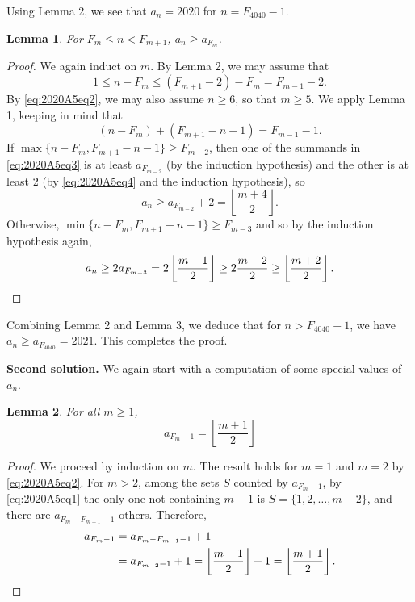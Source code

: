 \documentclass[amssymb,twocolumn,pra,10pt,aps]{revtex4-1}
\newtheorem{lemma}{Lemma}
\begin{document}
\begin{itemize}
Using Lemma 2, we see that $a_n = 2020$ for $n = F_{4040}-1$.

\begin{lemma}
For $F_m \leq n < F_{m+1}$, $a_n \geq a_{F_m}$.
\end{lemma}
\begin{proof}
We again induct on $m$.
By Lemma 2, we may assume that 
\begin{equation} \label{eq:2020A5eq4}
1 \leq n -F_m \leq (F_{m+1}-2) - F_m = F_{m-1} - 2.
\end{equation}
By \eqref{eq:2020A5eq2}, we may also assume $n \geq 6$, so that $m \geq 5$. We apply Lemma 1, keeping in mind that
\[
(n-F_m) + (F_{m+1}-n-1) = F_{m-1}-1.
\]
If $\max\{n-F_m, F_{m+1}-n-1\} \geq F_{m-2}$, then one of the summands in \eqref{eq:2020A5eq3} 
is at least $a_{F_{m-2}}$ (by the induction hypothesis) and the other is at least 2 (by \eqref{eq:2020A5eq4} and the induction hypothesis),
so 
\[
a_n \geq a_{F_{m-2}}+2 = \left\lfloor \frac{m+4}{2} \right\rfloor. 
\]
Otherwise,
$\min\{n-F_m, F_{m+1}-n-1\} \geq F_{m-3}$ and so by the induction hypothesis again,
\[
a_n \geq 2a_{F_{m-3}} = 2 \left\lfloor \frac{m-1}{2} \right\rfloor \geq 2 \frac{m-2}{2} \geq \left\lfloor \frac{m+2}{2} \right\rfloor. \qedhere
\]
\end{proof}

Combining Lemma 2 and Lemma 3, we deduce that for $n > F_{4040}-1$, we have $a_n \geq a_{F_{4040}} = 2021$. This completes the proof.

\noindent
\textbf{Second solution.}
We again start with a computation of some special values of $a_n$.

\setcounter{lemma}{0}
\begin{lemma}
For all $m \geq 1$,
\[
a_{F_m-1} = \left\lfloor \frac{m+1}2 \right\rfloor
\]
\end{lemma}
\begin{proof}
We proceed by induction on $m$. The result holds for $m=1$ and $m=2$ by \eqref{eq:2020A5eq2}. For $m>2$, among the sets $S$ counted by $a_{F_m-1}$,
by \eqref{eq:2020A5eq1} the only one not containing $m-1$ is $S=\{1,2,\ldots,m-2\}$,
and there are $a_{F_m-F_{m-1}-1}$ others. Therefore, 
\begin{align*}
a_{F_m-1} &= a_{F_m-F_{m-1}-1} + 1\\
& = a_{F_{m-2}-1}+1 = \left\lfloor \frac{m-1}2 \right\rfloor+1 = \left\lfloor \frac{m+1}2 \right\rfloor. \qedhere
\end{align*}
\end{proof}


\end{itemize}
\end{document}
